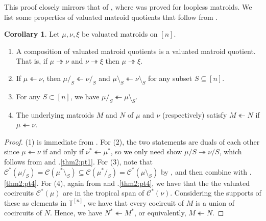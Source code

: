 \documentclass[11pt]{amsart}
\newcommand{\TT}{\mathbb T}
\theoremstyle{definition}
\newtheorem{cor}[thm]{Corollary}
\newcommand{\madeline}[1]{{\color{magenta} \sf  Madeline: [#1]}}
\begin{document}
This proof closely mirrors that of \cite[Theorem 1]{Haq12}, where  was proved for loopless matroids.
We list some properties of valuated matroid quotients that follow from .

\begin{cor}\label{cor:firstprop}
Let $\mu, \nu, \xi$ be valuated matroids on $[n]$.
\begin{enumerate}
\item A composition of valuated matroid quotients is a valuated matroid quotient.  That is, if $\mu\twoheadrightarrow \nu$ and $\nu\twoheadrightarrow \xi$ then $\mu\twoheadrightarrow \xi$.
\item If $\mu\twoheadleftarrow \nu$, then $\mu/_S \twoheadleftarrow \nu/_S$ and $\mu\setminus_S \twoheadleftarrow \nu\setminus_S$ for any subset $S \subseteq [n]$.
\item For any $S\subset [n]$, we have $\mu/_S \twoheadleftarrow \mu\setminus _S$. 
\item The underlying matroids $M$ and $N$ of $\mu$ and $\nu$ (respectively) satisfy $M\twoheadleftarrow N$ if $\mu\twoheadleftarrow \nu$.
\end{enumerate}
\end{cor}

\begin{proof}
(1) is immediate from .  For (2), the two statements are duals of each other since $\mu\twoheadleftarrow \nu$ if and only if $\nu^* \twoheadleftarrow \mu^*$, so we only need show $\mu/S\twoheadrightarrow \nu/S$, which follows from  and .\ref{thm2:pt1}.  For (3), note that $\mathcal C^*(\mu/_S) = \mathcal C(\mu^*\setminus_S) \subseteq \mathcal C(\mu^*/_S) = \mathcal C^*(\mu\setminus_S)$ by , and then combine  with .\ref{thm2:pt4}.  For (4), again from  and .\ref{thm2:pt4}, we have that the the valuated cocircuits $\mathcal C^*(\mu)$ are in the tropical span of $\mathcal C^*(\nu)$.  Considering the supports of these as elements in $\TT^{[n]}$, we have that every cocircuit of $M$ is a union of cocircuits of $N$.  Hence, we have $N^* \twoheadleftarrow M^*$, or equivalently, $M\twoheadleftarrow N$.
\end{proof}
\end{document}
